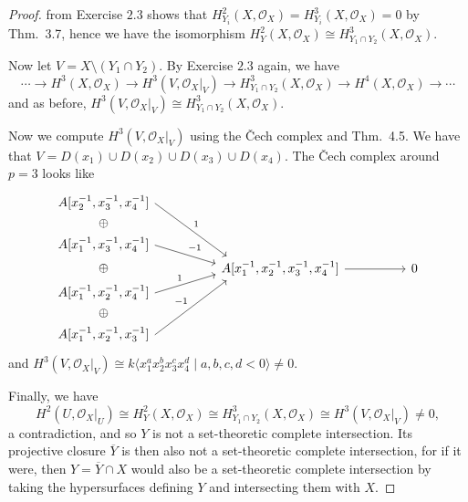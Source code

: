 \documentclass[10pt]{article}
\theoremstyle{definition}
\theoremstyle{remark}
\numberwithin{equation}{section}
\numberwithin{figure}{subsubsection}
\newcommand{\OO}{\mathcal{O}}
\begin{document}
\begin{proof}
  from Exercise $2.3$ shows that $H^2_{Y_i}(X,\OO_X) = H^3_{Y_i}(X,\OO_X) = 0$ by
  Thm.\ 3.7, hence we have the isomorphism
  $H^2_Y(X,\OO_X) \cong H^3_{Y_1 \cap Y_2}(X,\OO_X)$.
  \par Now let $V = X \setminus (Y_1 \cap Y_2)$. By Exercise $2.3$ again, we have
  \begin{equation*}
    \cdots \longrightarrow H^3(X,\OO_X) \longrightarrow
    H^3(V,\OO_X\rvert_{V}) \longrightarrow H^3_{Y_1 \cap
    Y_2}(X,\OO_X) \longrightarrow H^4(X,\OO_X) \longrightarrow \cdots
  \end{equation*}
  and as before, $H^3(V,\OO_X\rvert_V) \cong H^3_{Y_1 \cap Y_2}(X,\OO_X)$.
  \par Now we compute $H^3(V,\OO_X\rvert_V)$ using the \v{C}ech complex and
  Thm.\ 4.5. We have that $V = D(x_1) \cup D(x_2) \cup D(x_3) \cup D(x_4)$. The
  \v{C}ech complex around $p=3$ looks like
  \begin{equation*}
    \begin{tikzcd}[row sep=0,column sep=huge]
      A[x_2^{-1},x_3^{-1},x_4^{-1}] \arrow[phantom]{dd}{\oplus}\arrow[start
      anchor=east,end anchor={[xshift=2ex]north west}]{dddr}{1}\\
      & \vphantom{A}\\
      A[x_1^{-1},x_3^{-1},x_4^{-1}] \arrow[phantom]{dd}{\oplus}\arrow[start
      anchor=east, end anchor={[yshift=1ex]west}]{dr}{-1}\\
      & A[x_1^{-1},x_2^{-1},x_3^{-1},x_4^{-1}] \rar & 0\\
      A[x_1^{-1},x_2^{-1},x_4^{-1}] \arrow[phantom]{dd}{\oplus}\arrow[start
      anchor=east, end anchor={[yshift=-1ex]west}]{ur}{1}\\
      & \vphantom{A}\\
      A[x_1^{-1},x_2^{-1},x_3^{-1}] \arrow[start anchor=east,end
      anchor={[xshift=2ex]south west}]{uuur}{-1}
    \end{tikzcd}
  \end{equation*}
  and $H^3(V,\OO_X\rvert_V) \cong k\langle x_1^ax_2^bx_3^cx_4^d \mid a,b,c,d <
  0\rangle \ne 0$.
  \par Finally, we have
  \begin{equation*}
    H^2(U,\OO_X\rvert_U) \cong H^2_Y(X,\OO_X) \cong H^3_{Y_1 \cap Y_2}(X,\OO_X)
    \cong H^3(V,\OO_X\rvert_V) \ne 0,
  \end{equation*}
  a contradiction, and so $Y$ is not a set-theoretic complete intersection. Its
  projective closure $\overline{Y}$ is then also not a set-theoretic complete
  intersection, for if it were, then $Y = \overline{Y} \cap X$ would also be a
  set-theoretic complete intersection by taking the hypersurfaces defining
  $Y$ and intersecting them with $X$.
\end{proof}
\end{document}
